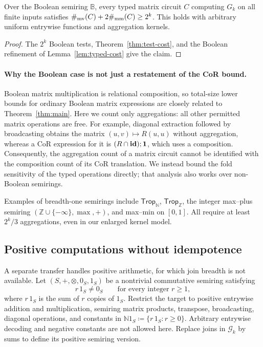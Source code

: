 \begin{theorem}\label{thm:boolean-matrix}
Over the Boolean semiring $\mathbb B$, every typed matrix circuit
$C$ computing $G_k$ on all finite inputs satisfies
$\#_{\mathrm{mv}}(C)+2\#_{\mathrm{mm}}(C)\ge2^k$.
This holds with arbitrary uniform entrywise functions and
aggregation kernels.
\end{theorem}
\begin{proof}
The $2^k$ Boolean tests, Theorem~\ref{thm:test-cost}, and the
Boolean refinement of Lemma~\ref{lem:typed-cost} give the claim.
\end{proof}

\paragraph{Why the Boolean case is not just a restatement of the CoR bound.}
Boolean matrix multiplication is relational composition, so total-size
lower bounds for ordinary Boolean matrix expressions are closely
related to Theorem~\ref{thm:main}. Here we count only aggregations:
all other permitted matrix operations are free. For example,
diagonal extraction followed by broadcasting obtains the matrix
$(u,v)\mapsto R(u,u)$ without aggregation, whereas a CoR expression
for it is $(R\cap\mathbf{id});\mathbf{1}$, which uses a composition.
Consequently, the aggregation count of a matrix circuit cannot be
identified with the composition count of its CoR translation.
We instead bound the fold sensitivity of the typed operations directly;
that analysis also works over non-Boolean semirings.

Examples of breadth-one semirings include
$\mathsf{Trop}_{\mathbb N}$, $\mathsf{Trop}_{\mathbb Z}$,
the integer max--plus semiring
$(\mathbb Z\cup\{-\infty\},\max,+)$, and max--min on $[0,1]$.
All require at least $2^k/3$ aggregations, even in our enlarged
kernel model.

\subsection{Positive computations without idempotence}\label{sec:positive}
A separate transfer handles positive arithmetic, for which join breadth
is not available. Let $(S,+,\otimes,0_S,1_S)$ be a nontrivial commutative
semiring satisfying
\begin{equation*}\tag{NV}\label{eq:positive-characteristic}
 r\,1_S\ne0_S\qquad\text{for every integer }r\ge1,
\end{equation*}
where $r\,1_S$ is the sum of $r$ copies of $1_S$.
Restrict the target to positive entrywise addition and multiplication,
semiring matrix products, transpose, broadcasting, diagonal operations,
and constants in $\mathbb N1_S\coloneqq\{r\,1_S:r\ge0\}$.
Arbitrary entrywise decoding and negative constants are not allowed here.
Replace joins in $\mathcal G_k$ by sums to define its positive
semiring version.

